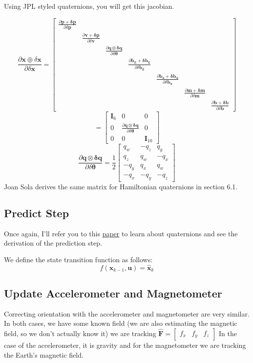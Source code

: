 \documentclass[11pt]{article}
\renewcommand{\vec}[1]{\mathbf{#1}}
\renewcommand{\tilde}[1]{\expandafter\hat{#1}}
\newcommand{\mat}[1]{\mathbf{#1}}
\begin{document}
Using JPL styled quaternions, you will get this jacobian. 

$$\frac{\partial \vec{x} \oplus \delta \vec{x}}{\partial \delta \vec{x}} = \begin{bmatrix}
\frac{\partial \vec{p+\delta p}}{\partial \delta \vec{p}}\\
& \frac{\partial \vec{v+\delta p}}{\partial \delta \vec{v}} \\
& & \frac{\partial \vec{q \otimes \delta q}}{\partial \delta \vec{\theta}}\\
& & & \frac{\partial \vec{b_g+\delta b_g}}{\partial \delta \vec{b_g}}\\
& & & & \frac{\partial \vec{b_a+\delta b_a}}{\partial \delta \vec{b_a}}\\
& & & & & \frac{\partial \vec{m+\delta m}}{\partial \delta \vec{m}}\\
& & & & & & \frac{\partial \vec{b+\delta b}}{\partial \delta \vec{b}}
\end{bmatrix}$$
$$ = \begin{bmatrix}
\mat{I}_6 & 0 & 0 \\
0 & \frac{\partial \vec{q \otimes \delta q}}{\partial \delta \vec{\theta}} & 0 \\
0 & 0 & \mat{I}_{10}
\end{bmatrix}
$$
$$
\frac{\partial \vec{q\otimes \delta q}}{\partial \delta \vec{\theta}} = \frac{1}{2}\begin{bmatrix}
q_w & -q_z & q_y\\
q_z & q_w & -q_x\\
-q_y & q_x & q_w\\
-q_x & -q_y & -q_z
\end{bmatrix} $$
Joan Sola derives the same matrix for Hamiltonian quaternions in section 6.1.
\subsection{Predict Step}
Once again, I'll refer you to this \href{http://www.iri.upc.edu/people/jsola/JoanSola/objectes/notes/kinematics.pdf}{paper} to learn about quaternions and see the derivation of the prediction step.

We define the state transition function as follows:
$$f(\vec{x}_{k-1}, \vec{u}) = \tilde{\vec{x}}_k$$

\subsection{Update Accelerometer and Magnetometer}
Correcting orientation with the accelerometer and magnetometer are very similar. In both cases, we have some known field (we are also estimating the magnetic field, so we don't actually know it) we are tracking $\hat{\vec{F}} = \begin{bmatrix}
f_x & f_y & f_z
\end{bmatrix}$ In the case of the accelerometer, it is gravity and for the magnetometer we are tracking the Earth's magnetic field.
	
\end{document}
